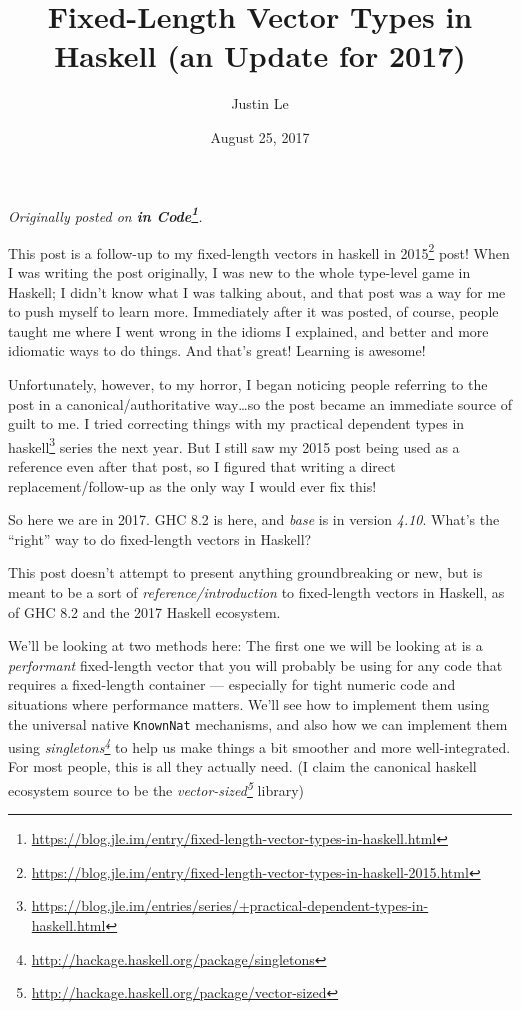 \documentclass[]{article}
\title{Fixed-Length Vector Types in Haskell (an Update for 2017)}
\author{Justin Le}
\date{August 25, 2017}
\renewcommand{\href}[2]{#2\footnote{\url{#1}}}
\begin{document}
\maketitle

\emph{Originally posted on
\textbf{\href{https://blog.jle.im/entry/fixed-length-vector-types-in-haskell.html}{in
Code}}.}

This post is a follow-up to my
\href{https://blog.jle.im/entry/fixed-length-vector-types-in-haskell-2015.html}{fixed-length
vectors in haskell in 2015} post! When I was writing the post originally, I was
new to the whole type-level game in Haskell; I didn't know what I was talking
about, and that post was a way for me to push myself to learn more. Immediately
after it was posted, of course, people taught me where I went wrong in the
idioms I explained, and better and more idiomatic ways to do things. And that's
great! Learning is awesome!

Unfortunately, however, to my horror, I began noticing people referring to the
post in a canonical/authoritative way\ldots{}so the post became an immediate
source of guilt to me. I tried correcting things with my
\href{https://blog.jle.im/entries/series/+practical-dependent-types-in-haskell.html}{practical
dependent types in haskell} series the next year. But I still saw my 2015 post
being used as a reference even after that post, so I figured that writing a
direct replacement/follow-up as the only way I would ever fix this!

So here we are in 2017. GHC 8.2 is here, and \emph{base} is in version
\emph{4.10}. What's the ``right'' way to do fixed-length vectors in Haskell?

This post doesn't attempt to present anything groundbreaking or new, but is
meant to be a sort of \emph{reference/introduction} to fixed-length vectors in
Haskell, as of GHC 8.2 and the 2017 Haskell ecosystem.

We'll be looking at two methods here: The first one we will be looking at is a
\emph{performant} fixed-length vector that you will probably be using for any
code that requires a fixed-length container --- especially for tight numeric
code and situations where performance matters. We'll see how to implement them
using the universal native \texttt{KnownNat} mechanisms, and also how we can
implement them using
\emph{\href{http://hackage.haskell.org/package/singletons}{singletons}} to help
us make things a bit smoother and more well-integrated. For most people, this is
all they actually need. (I claim the canonical haskell ecosystem source to be
the \emph{\href{http://hackage.haskell.org/package/vector-sized}{vector-sized}}
library)
\end{document}
